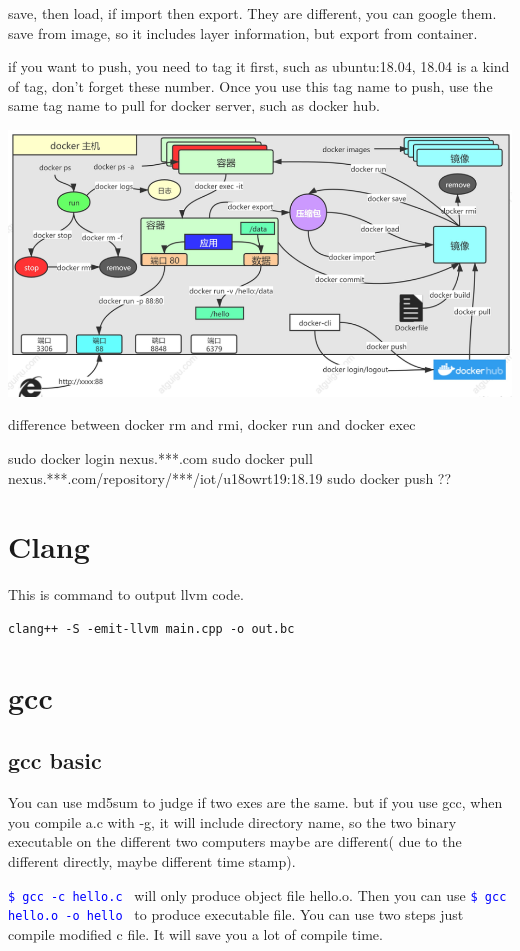 \documentclass[paper=8.5in:11in, twoside, 12pt, pagesize=pdftex]{book}
\newcommand{\linuxcommand}[1]{\texttt{\textcolor{blue}{\$ #1 \Pisymbol{psy}{191}}}}
\begin{document}
save, then load,  if import then export. They are different, you can google them.
save from image, so it includes layer information, but export from container. 

if you want to push, you need to tag it first,  such as ubuntu:18.04,  18.04 is a kind of tag, don't forget these number.  Once you use this tag name to push, use the same tag name to pull for docker server, such as docker hub. 

\begin{center}
	\includegraphics[width=0.7\linewidth]{pics/docker}
\end{center}

difference between docker rm and rmi, docker run and docker exec

sudo docker login nexus.***.com
sudo docker pull nexus.***.com/repository/***/iot/u18owrt19:18.19
sudo docker push ??


\section{Clang}
This is command to output llvm code.
\begin{lstlisting}
clang++ -S -emit-llvm main.cpp -o out.bc
\end{lstlisting}				


\section{gcc}
\subsection{gcc basic}
   You can use md5sum to judge if two exes are the same. but if you use gcc, when you compile a.c with -g, it will include directory name, so the two binary executable on the different two computers maybe are different( due to the different directly, maybe different time stamp). 

   \linuxcommand{gcc -c hello.c} will only produce object file hello.o. Then you can use \linuxcommand{gcc hello.o -o hello} to produce executable file. You can use two steps just compile modified c file. It will save you a lot of compile time.
   
\end{document}
